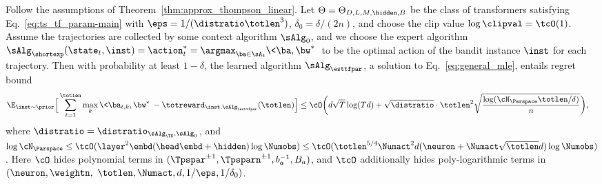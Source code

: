 \documentclass[10pt]{article}
\newcommand{\authnote}[2]{{\scriptsize $\ll$\textsf{#1 notes: #2}$\gg$}}
\newcommand{\authnote}[2]{}
\newcommand{\lc}[1]{{\color{blue}\authnote{Licong}{#1}}}
\begin{document}
\begin{theorem}
\label{thm:ts_linear_regret}
Follow the assumptions of Theorem~\ref{thm:approx_thompson_linear}. Let $\Theta = \Theta_{D, L, M, \hidden, B}$ be the class of transformers satisfying Eq.~\eqref{eq:ts_tf_param-main} with $\eps=1/(\distratio\totlen^3)$,   $\delta_0=\delta/(2n)$, and choose the clip value $\log \clipval = \tcO(1)$. Assume the trajectories are collected by some context algorithm $\sAlg_0$, and we choose the expert algorithm $\sAlg_\shortexp(\state_t,\inst)=\action^*_t=\argmax_{\ba\in\sA_t}\<\ba,\bw^*\>$ to be the optimal action of the bandit instance $\inst$ for each trajectory. Then with probability at least $1-\delta$, the learned algorithm $\sAlg_{\esttfpar}$, a solution to Eq.~\eqref{eq:general_mle}, entails regret bound
\begin{align*}
\E_{\inst\sim\prior}\Big[\sum_{t=1}^\totlen\max_{k}\<\ba_{t,k},\bw^*\>-\totreward_{\inst,\sAlg_\esttfpar}(\totlen)\Big]&\leq \cO \bigg( d\sqrt{T}\log(Td)+ \sqrt{\distratio} \cdot\totlen^2\sqrt{\frac{\log ( \cN_{\Parspace} \totlen/\delta ) }{n} } \bigg), 
\end{align*}
where $\distratio = \distratio_{\sAlg_\TS,\sAlg_0}$, and $\log \cN_{\Parspace} \le \tcO(\layer^2\embd(\head\embd+\hidden)\log \Numobs )  \leq\tcO(\totlen^{5/4}\Numact^2 d(\neuron+\Numact\sqrt{\totlen}d)\log\Numobs)$. Here $\cO$ hides polynomial terms in $(\Tpspar^{\pm1}, \Tpsparn^{\pm1}, b_a^{-1}, B_a)$, and $\tcO$ additionally hides poly-logarithmic terms in   $(\neuron,\weightn,\\~ \totlen, \Numact, d, 1/\eps, 1/\delta_0)$. 
\end{theorem}

\end{document}

